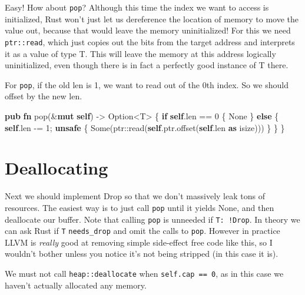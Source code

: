 \documentclass[a4paper,]{book}
\newenvironment{Shaded}{\begin{snugshade}}{\end{snugshade}}
\newcommand{\KeywordTok}[1]{\textcolor[rgb]{0.13,0.29,0.53}{\textbf{{#1}}}}
\newcommand{\DataTypeTok}[1]{\textcolor[rgb]{0.13,0.29,0.53}{{#1}}}
\newcommand{\DecValTok}[1]{\textcolor[rgb]{0.00,0.00,0.81}{{#1}}}
\newcommand{\ConstantTok}[1]{\textcolor[rgb]{0.00,0.00,0.00}{{#1}}}
\newcommand{\NormalTok}[1]{{#1}}
\begin{document}
Easy! How about \texttt{pop}? Although this time the index we want to
access is initialized, Rust won't just let us dereference the location
of memory to move the value out, because that would leave the memory
uninitialized! For this we need \texttt{ptr::read}, which just copies
out the bits from the target address and interprets it as a value of
type T. This will leave the memory at this address logically
uninitialized, even though there is in fact a perfectly good instance of
T there.

For \texttt{pop}, if the old len is 1, we want to read out of the 0th
index. So we should offset by the new len.

\begin{Shaded}
\begin{Highlighting}[]
\KeywordTok{pub} \KeywordTok{fn} \NormalTok{pop(&}\KeywordTok{mut} \KeywordTok{self}\NormalTok{) -> }\DataTypeTok{Option}\NormalTok{<T> \{}
    \KeywordTok{if} \KeywordTok{self}\NormalTok{.len == }\DecValTok{0} \NormalTok{\{}
        \ConstantTok{None}
    \NormalTok{\} }\KeywordTok{else} \NormalTok{\{}
        \KeywordTok{self}\NormalTok{.len -= }\DecValTok{1}\NormalTok{;}
        \KeywordTok{unsafe} \NormalTok{\{}
            \ConstantTok{Some}\NormalTok{(ptr::read(}\KeywordTok{self}\NormalTok{.ptr.offset(}\KeywordTok{self}\NormalTok{.len }\KeywordTok{as} \DataTypeTok{isize}\NormalTok{)))}
        \NormalTok{\}}
    \NormalTok{\}}
\NormalTok{\}}
\end{Highlighting}
\end{Shaded}

\section{Deallocating}\label{sec--vec-dealloc}

Next we should implement Drop so that we don't massively leak tons of
resources. The easiest way is to just call \texttt{pop} until it yields
None, and then deallocate our buffer. Note that calling \texttt{pop} is
unneeded if \texttt{T:\ !Drop}. In theory we can ask Rust if \texttt{T}
\texttt{needs\_drop} and omit the calls to \texttt{pop}. However in
practice LLVM is \emph{really} good at removing simple side-effect free
code like this, so I wouldn't bother unless you notice it's not being
stripped (in this case it is).

We must not call \texttt{heap::deallocate} when
\texttt{self.cap\ ==\ 0}, as in this case we haven't actually allocated
any memory.
\end{document}
